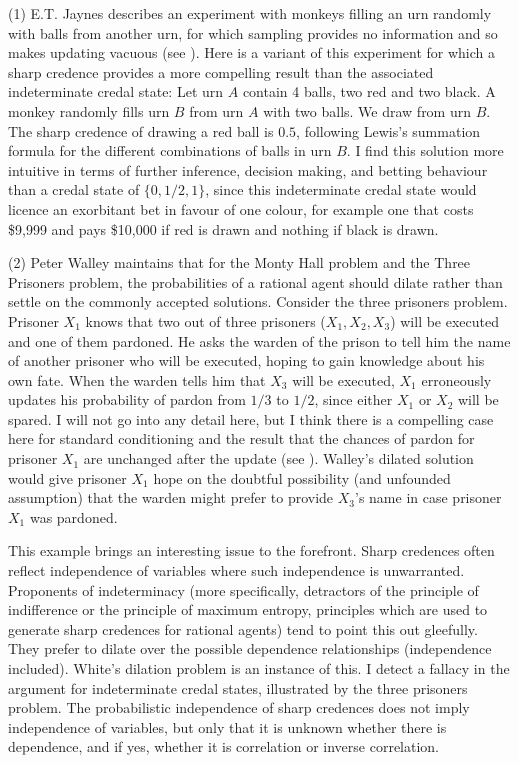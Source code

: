 (1) E.T. Jaynes describes an experiment with monkeys
filling an urn randomly with balls from another urn,
for which sampling provides no information and so makes
updating vacuous (see
). Here is a variant
of this experiment for which a sharp credence provides
a more compelling result than the associated
indeterminate credal state: Let urn $A$ contain 4
balls, two red and two black. A monkey randomly fills
urn $B$ from urn $A$ with two balls. We draw from urn
$B$. The sharp credence of drawing a red ball is $0.5$,
following Lewis's summation formula for the different
combinations of balls in urn $B$. I find this solution
more intuitive in terms of further inference, decision
making, and betting behaviour than a credal state of
$\{0,1/2,1\}$, since this indeterminate credal state
would licence an exorbitant bet in favour of one
colour, for example one that costs \$9,999 and pays
\$10,000 if red is drawn and nothing if black is drawn.

(2) Peter Walley maintains that for the Monty Hall
problem and the Three Prisoners problem, the
probabilities of a rational agent should dilate rather
than settle on the commonly accepted solutions.
Consider the three prisoners problem. Prisoner $X_{1}$
knows that two out of three prisoners
($X_{1},X_{2},X_{3}$) will be executed and one of them
pardoned. He asks the warden of the prison to tell him
the name of another prisoner who will be executed,
hoping to gain knowledge about his own fate. When the
warden tells him that $X_{3}$ will be executed, $X_{1}$
erroneously updates his probability of pardon from
$1/3$ to $1/2$, since either $X_{1}$ or $X_{2}$ will be
spared. I will not go into any detail here, but I think
there is a compelling case here for standard
conditioning and the result that the chances of pardon
for prisoner $X_{1}$ are unchanged after the update
(see ). Walley's dilated
solution would give prisoner $X_{1}$ hope on the
doubtful possibility (and unfounded assumption) that
the warden might prefer to provide $X_{3}$'s name in
case prisoner $X_{1}$ was pardoned.

This example brings an interesting issue to the
forefront. Sharp credences often reflect independence
of variables where such independence is unwarranted.
Proponents of indeterminacy (more specifically,
detractors of the principle of indifference or the
principle of maximum entropy, principles which are used
to generate sharp credences for rational agents) tend
to point this out gleefully. They prefer to dilate over
the possible dependence relationships (independence
included). White's dilation problem is an instance of
this. I detect a fallacy in the argument for
indeterminate credal states, illustrated by the three
prisoners problem. The probabilistic independence of
sharp credences does not imply independence of
variables, but only that it is unknown whether there is
dependence, and if yes, whether it is correlation or
inverse correlation.

